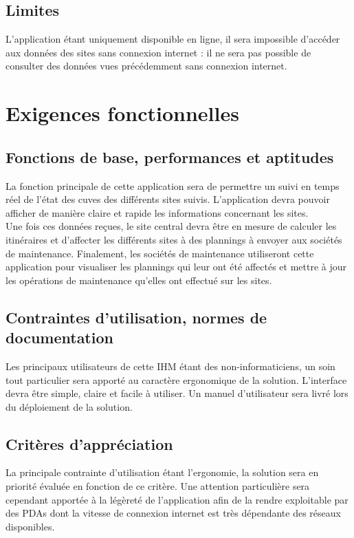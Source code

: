 \subsection{Limites}
L'application étant uniquement disponible en ligne, il sera impossible d'accéder aux données des sites sans connexion internet : il ne sera pas possible de consulter des données vues précédemment sans connexion internet. 

\section{Exigences fonctionnelles}
\subsection{Fonctions de base, performances et aptitudes}
La fonction principale de cette application sera de permettre un suivi en temps réel de l'état des cuves des différents sites suivis. L'application devra pouvoir afficher de manière claire et rapide les informations concernant les sites.\\
Une fois ces données reçues, le site central devra être en mesure de calculer les itinéraires et d'affecter les différents sites à des plannings à envoyer aux sociétés de maintenance. Finalement, les sociétés de maintenance utiliseront cette application pour visualiser les plannings qui leur ont été affectés et mettre à jour les opérations de maintenance qu'elles ont effectué sur les sites.

\subsection{Contraintes d'utilisation, normes de documentation}
Les principaux utilisateurs de cette IHM étant des non-informaticiens, un soin tout particulier sera apporté au caractère ergonomique de la solution. L'interface devra être simple, claire et facile à utiliser. Un manuel d'utilisateur sera livré lors du déploiement de la solution.

\subsection{Critères d'appréciation}
La principale contrainte d'utilisation étant l'ergonomie, la solution sera en priorité évaluée en fonction de ce critère. Une attention particulière sera cependant apportée à la légèreté de l'application afin de la rendre exploitable par des PDAs dont la vitesse de connexion internet est très dépendante des réseaux disponibles.

